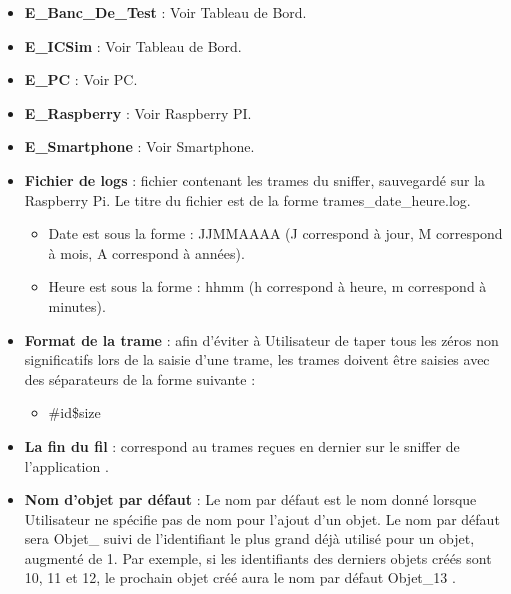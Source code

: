 \begin{itemize}
\begin{itemize}
            \newline
        \end{itemize}
    \item \textbf{E\_Banc\_De\_Test} : Voir Tableau de Bord.\newline
    \item \textbf{E\_ICSim} : Voir Tableau de Bord.\newline
    \item \textbf{E\_PC} : Voir PC.\newline
    \item \textbf{E\_Raspberry} : Voir Raspberry PI.\newline
    \item \textbf{E\_Smartphone} : Voir Smartphone.\newline
    \item \textbf{Fichier de logs} : fichier contenant les trames du sniffer, sauvegardé sur la Raspberry Pi. Le titre du fichier est de la forme trames\_date\_heure.log.
        \begin{itemize}
            \item Date est sous la forme : JJMMAAAA (J correspond à jour, M correspond à mois, A correspond à années).
            \item Heure est sous la forme : hhmm (h correspond à heure, m correspond à minutes). \newline
        \end{itemize}
    \item \textbf{Format de la trame} : afin d'éviter à Utilisateur de taper tous les zéros non significatifs lors de la saisie d'une trame, les trames doivent être saisies avec des séparateurs de la forme suivante : 
        \begin{itemize}
            \item \#id\$size\@@message \newline
        \end{itemize}
    \item \textbf{La fin du fil} : correspond au trames reçues en dernier sur le sniffer de l'application {\nomApplication}.\newline
    \item \textbf{Nom d'objet par défaut} : Le nom par défaut est le nom donné lorsque Utilisateur ne spécifie pas de nom pour l'ajout d'un objet. Le nom par défaut sera {\guillemetleft} Objet\_ {\guillemetright} suivi de l'identifiant le plus grand déjà utilisé pour un objet, augmenté de 1. Par exemple, si les identifiants des derniers objets créés sont 10, 11 et 12, le prochain objet créé aura le nom par défaut {\guillemetleft} Objet\_13 {\guillemetright}.\newline

\end{itemize}
